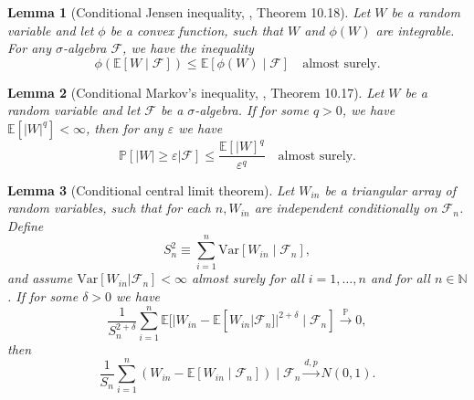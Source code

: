 \documentclass[12pt]{article}
\newtheorem{lemma}{Lemma}
\theoremstyle{definition}
\def\P{\mathbb{P}}
\def\P{\mathbb{P}}
\newcommand{\E}{\mathbb E}								%
\newcommand{\V}{\mathrm{Var}}							%
\renewcommand{\P}{\mathbb{P}}							%
\newcommand{\convp}{\overset{\mathbb{P}}{\rightarrow}}             %
\newcommand{\convdp}{\overset {d,p} \longrightarrow}    %
\begin{document}
\begin{lemma}[Conditional Jensen inequality, \cite{Davidson2003}, Theorem 10.18] \label{lem:conditional-jensen}
	Let $W$ be a random variable and let $\phi$ be a convex function, such that $W$ and $\phi(W)$ are integrable. For any $\sigma$-algebra $\mathcal F$, we have the inequality
	\begin{equation*}
		\phi(\E[W \mid \mathcal F]) \leq  \E[\phi(W) \mid \mathcal F] \quad \text{almost surely}.
	\end{equation*}
\end{lemma}

\begin{lemma}[Conditional Markov's inequality, \cite{Davidson2003}, Theorem 10.17]\label{lem:conditional_Markov}
  Let $W$ be a random variable and let $\mathcal{F}$ be a $\sigma$-algebra. If for some $q>0$, we have $\E[|W|^q]<\infty$, then for any $\varepsilon$ we have
	\begin{equation*}
		\P[|W|\geq \varepsilon|\mathcal{F}]\leq \frac{\E[|W]^q}{\varepsilon^q}\quad\text{almost surely}.
	\end{equation*}
\end{lemma}

\begin{lemma}[Conditional central limit theorem] \label{lem:lyapunov-clt} 
	Let $W_{in}$ be a triangular array of random variables, such that for each $n,W_{in}$ are independent conditionally on $\mathcal F_n$. Define
	\begin{equation}
		S_n^2 \equiv \sum_{i = 1}^n \V[W_{in} \mid \mathcal F_n],
	\end{equation} 
	and assume $\mathrm{Var}[W_{in}|\mathcal{F}_n]<\infty $ almost surely for all $i=1,\ldots,n$ and for all $n\in\mathbb{N}$. If for some $\delta > 0$ we have
	\begin{equation}
		\frac{1}{S_n^{2+\delta}} \sum_{i = 1}^n \E[|W_{in}-\E[W_{in}|\mathcal{F}_n]|^{2+\delta} \mid \mathcal{F}_n] \convp 0,
		\label{eq:conditional-lyapunov}
	\end{equation}
	then 
	\begin{equation}
		\frac{1}{S_n} \sum_{i = 1}^n (W_{in} - \E[W_{in} \mid \mathcal{F}_n]) \mid \mathcal F_n \convdp N(0,1).
	\end{equation}
\end{lemma}
\end{document}
